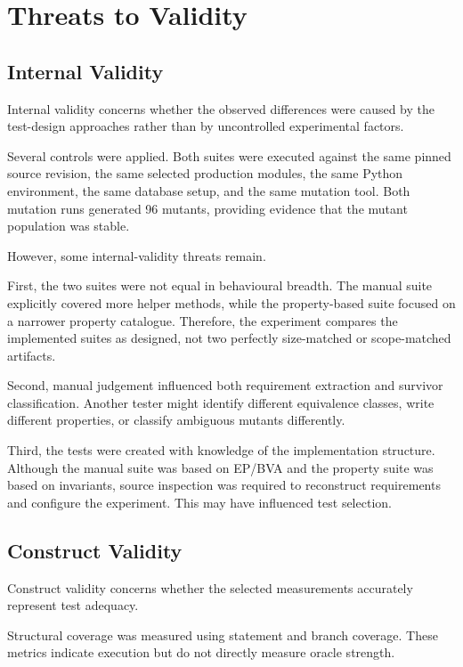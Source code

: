\documentclass[12pt]{article}
\begin{document}
\section{Threats to Validity}

\subsection{Internal Validity}

Internal validity concerns whether the observed differences were caused by the
test-design approaches rather than by uncontrolled experimental factors.

Several controls were applied. Both suites were executed against the same
pinned source revision, the same selected production modules, the same Python
environment, the same database setup, and the same mutation tool. Both mutation
runs generated 96 mutants, providing evidence that the mutant population was
stable.

However, some internal-validity threats remain.

First, the two suites were not equal in behavioural breadth. The manual suite
explicitly covered more helper methods, while the property-based suite focused
on a narrower property catalogue. Therefore, the experiment compares the
implemented suites as designed, not two perfectly size-matched or
scope-matched artifacts.

Second, manual judgement influenced both requirement extraction and survivor
classification. Another tester might identify different equivalence classes,
write different properties, or classify ambiguous mutants differently.

Third, the tests were created with knowledge of the implementation structure.
Although the manual suite was based on EP/BVA and the property suite was based
on invariants, source inspection was required to reconstruct requirements and
configure the experiment. This may have influenced test selection.

\subsection{Construct Validity}

Construct validity concerns whether the selected measurements accurately
represent test adequacy.

Structural coverage was measured using statement and branch coverage. These
metrics indicate execution but do not directly measure oracle strength.
\end{document}
